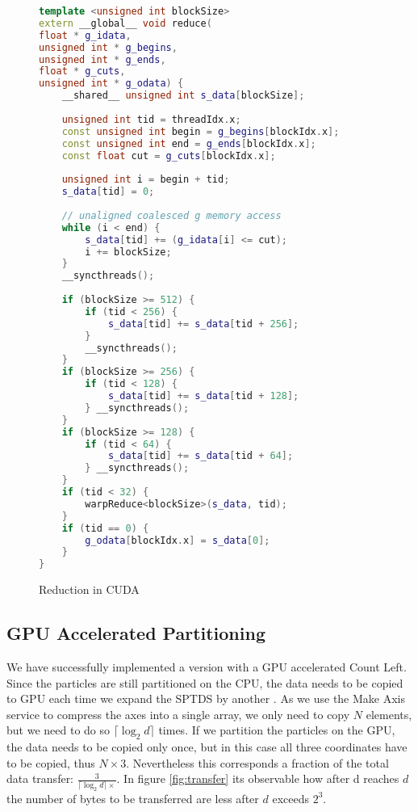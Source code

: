 \documentclass[]{article}
\begin{document}
\begin{figure}[H]
	\begin{lstlisting}[language=c++, caption=Kernel Optimized GPU Count Left, label = ctlocuda]
template <unsigned int blockSize>
extern __global__ void reduce(
float * g_idata,
unsigned int * g_begins,
unsigned int * g_ends,
float * g_cuts,
unsigned int * g_odata) {
	__shared__ unsigned int s_data[blockSize];
	
	unsigned int tid = threadIdx.x;
	const unsigned int begin = g_begins[blockIdx.x];
	const unsigned int end = g_ends[blockIdx.x];
	const float cut = g_cuts[blockIdx.x];
	
	unsigned int i = begin + tid;
	s_data[tid] = 0;
	
	// unaligned coalesced g memory access
	while (i < end) {
		s_data[tid] += (g_idata[i] <= cut);
		i += blockSize;
	}
	__syncthreads();
	
	if (blockSize >= 512) {
		if (tid < 256) {
			s_data[tid] += s_data[tid + 256];
		}
		__syncthreads();
	}
	if (blockSize >= 256) {
		if (tid < 128) {
			s_data[tid] += s_data[tid + 128];
		} __syncthreads();
	}
	if (blockSize >= 128) {
		if (tid < 64) {
			s_data[tid] += s_data[tid + 64];
		} __syncthreads();
	}
	if (tid < 32) {
		warpReduce<blockSize>(s_data, tid);
	}
	if (tid == 0) {
		g_odata[blockIdx.x] = s_data[0];
	}
}
	\end{lstlisting}
	\caption{Reduction in CUDA}
	\label{cuda:reduction2}
\end{figure}

\subsection{GPU Accelerated Partitioning}

We have successfully implemented a version with a GPU accelerated Count Left. Since the particles are still partitioned on the CPU, the data needs to be copied to GPU each time we expand the SPTDS by another . As we use the Make Axis service to compress the axes into a single array, we only need to copy $N$ elements, but we need to do so $\lceil \log_2 d \rceil$ times. 
If we partition the particles on the GPU, the data needs to be copied only once, but in this case all three coordinates have to be copied, thus $
N \times 3$. Nevertheless this corresponds a fraction of the total data transfer: $\frac{3}{\lceil \log_2 d \rceil \times}$. In figure \ref{fig:transfer} its observable how after d reaches $d$ the number of bytes to be transferred are less after $d$ exceeds $2^3$.
\end{document}
